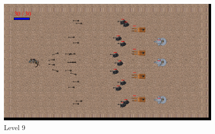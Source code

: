 \vspace{2cm}
\begin{figure}[h]
	
	\centering
	\includegraphics[width = \textwidth]{sec/pdf/level 9}
	\caption{Level 9}
\end{figure}




\newpage